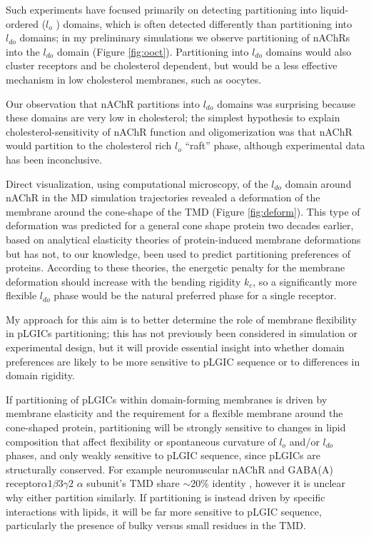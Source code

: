 Such experiments have focused primarily on detecting partitioning into liquid-ordered ($l_o$ ) domains, which is often detected differently than partitioning into $l_{do}$ domains; in my preliminary simulations we observe partitioning of nAChRs into the $l_{do}$ domain (Figure \ref{fig:ooct}). Partitioning into $l_{do}$ domains would also cluster receptors and be cholesterol dependent, but would be a less effective mechanism in low cholesterol membranes, such as oocytes.


Our observation that nAChR partitions into $l_{do}$ domains was surprising because these domains are very low in cholesterol; the simplest hypothesis to explain cholesterol-sensitivity of nAChR function and oligomerization was that nAChR would partition to the cholesterol rich $l_o$ “raft” phase, although experimental data has been inconclusive.

Direct visualization, using computational microscopy, of the $l_{do}$ domain around nAChR in the MD simulation trajectories revealed a deformation of the membrane around the cone-shape of the TMD (Figure \ref{fig:deform}). This type of deformation was predicted for a general cone shape protein two decades earlier, based on analytical elasticity theories of protein-induced membrane deformations \cite{Goulian1996,Weikl1998} but has not, to our knowledge, been used to predict partitioning preferences of proteins. According to these theories, the energetic penalty for the membrane deformation should increase with the bending rigidity $k_c$, so a significantly more flexible $l_{do}$ phase would be the natural preferred phase for a single receptor.

My approach for this aim is to better determine the role of membrane flexibility in pLGICs partitioning; this has not previously been considered in simulation or experimental design, but it will provide essential insight into whether domain preferences are likely to be more sensitive to pLGIC sequence or to differences in domain rigidity.


If partitioning of pLGICs within domain-forming membranes is driven by membrane elasticity and the requirement for a flexible membrane around the cone-shaped protein, partitioning will be strongly sensitive to changes in lipid composition that affect flexibility or spontaneous curvature of $l_o$ and/or $l_{do}$ phases, and only weakly sensitive to pLGIC sequence, since pLGICs are structurally conserved. For example neuromuscular nAChR and GABA(A) receptor$ \alpha 1\beta 3\gamma 2$ $\alpha$ subunit's TMD share $\sim 20 \%$ identity \cite{jalv}, however it is unclear why either partition similarly. If partitioning is instead driven by specific interactions with lipids, it will be far more sensitive to pLGIC sequence, particularly the presence of bulky versus small residues in the TMD. 

